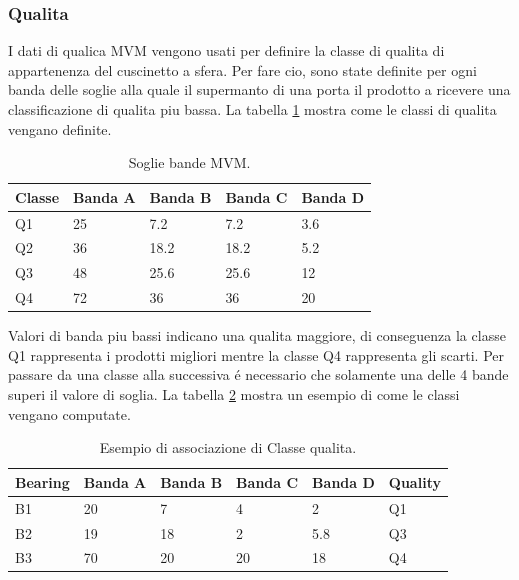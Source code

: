 \subsubsection{Qualita}
I dati di qualica MVM vengono usati per definire la classe di qualita di appartenenza del cuscinetto a sfera. Per fare cio, sono state definite per ogni banda delle soglie alla quale il supermanto di una porta il prodotto a ricevere una classificazione di qualita piu bassa.
La tabella \ref{mvm-soglie} mostra come le classi di qualita vengano definite.

\begin{table}
	\caption{\label{mvm-soglie}Soglie bande MVM.}
	\centering
	\begin{tabular}{|l|l|l|l|l|}
		\hline
		Classe & \multicolumn{1}{c|}{Banda A} & \multicolumn{1}{c|}{Banda B} & \multicolumn{1}{c|}{Banda C} & \multicolumn{1}{c|}{Banda D} \\ \hline
		Q1     & 25                           & 7.2                          & 7.2                          & 3.6                          \\ \hline
		Q2     & 36                           & 18.2                         & 18.2                         & 5.2                          \\ \hline
		Q3     & 48                           & 25.6                         & 25.6                         & 12                           \\ \hline
		Q4     & 72                           & 36                           & 36                           & 20                           \\ \hline
	\end{tabular}
\end{table}

Valori di banda piu bassi indicano una qualita maggiore, di conseguenza la classe Q1 rappresenta i prodotti migliori mentre la classe Q4 rappresenta gli scarti. 
Per passare da una classe alla successiva é necessario che solamente una delle 4 bande superi il valore di soglia. 
La tabella \ref{mvm-esempio} mostra un esempio di come le classi vengano computate.

\begin{table}
	\caption{\label{mvm-esempio}Esempio di associazione di Classe qualita.}
	\centering
	\begin{tabular}{|l|l|l|l|l|l|}
		\hline
		Bearing & \multicolumn{1}{c|}{Banda A} & \multicolumn{1}{c|}{Banda B} & \multicolumn{1}{c|}{Banda C} & \multicolumn{1}{c|}{Banda D} & Quality \\ \hline
		B1      & 20                           & 7                            & 4                            & 2                            & Q1      \\ \hline
		B2      & 19                           & 18                           & 2                            & 5.8                          & Q3      \\ \hline
		B3      & 70                           & 20                           & 20                           & 18                           & Q4      \\ \hline
	\end{tabular}
\end{table}

